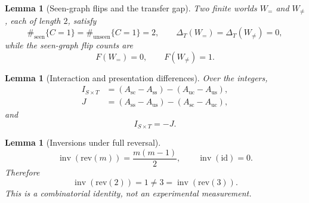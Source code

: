 \documentclass[11pt,a4paper]{article}
\theoremstyle{plain}
\newtheorem{lemma}[theorem]{Lemma}
\begin{document}
\begin{lemma}[Seen-graph flips and the transfer gap]
\label{lem:worlds-en}
Two finite worlds $W_{=}$ and $W_{\neq}$, each of length $2$, satisfy
\begin{equation}
\#_{\mathrm{seen}}\{C=1\}=\#_{\mathrm{unseen}}\{C=1\}=2,
\qquad
\Delta_T(W_{=})=\Delta_T(W_{\neq})=0,
\end{equation}
while the seen-graph flip counts are
\begin{equation}
F(W_{=})=0,\qquad F(W_{\neq})=1.
\end{equation}
\end{lemma}

\begin{lemma}[Interaction and presentation differences]
\label{lem:interaction-en}
Over the integers,
\begin{align}
I_{S\times T}
&=(A_{\mathrm{sc}}-A_{\mathrm{ss}})-(A_{\mathrm{uc}}-A_{\mathrm{us}}),\\
J
&=(A_{\mathrm{ss}}-A_{\mathrm{us}})-(A_{\mathrm{sc}}-A_{\mathrm{uc}}),
\end{align}
and
\begin{equation}
I_{S\times T}=-J.
\end{equation}
\end{lemma}

\begin{lemma}[Inversions under full reversal]
\label{lem:inversion-en}
\begin{equation}
\operatorname{inv}(\mathrm{rev}(m))=\frac{m(m-1)}{2},
\qquad
\operatorname{inv}(\mathrm{id})=0.
\end{equation}
Therefore
\begin{equation}
\operatorname{inv}(\mathrm{rev}(2))=1\neq 3=\operatorname{inv}(\mathrm{rev}(3)).
\end{equation}
This is a combinatorial identity, not an experimental measurement.
\end{lemma}
\end{document}
